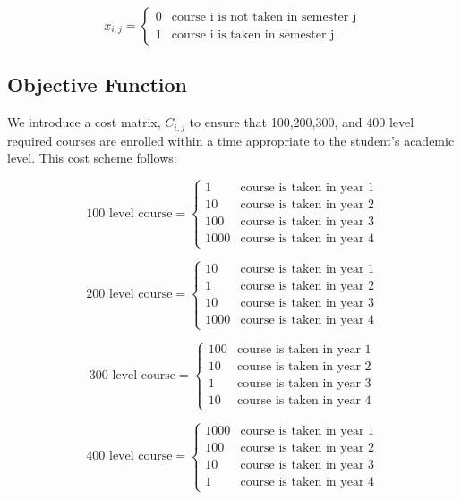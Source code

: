 \documentclass{article}
\begin{document}
\[ x_{i,j} = \begin{cases} 
      0 & \text{course i is not taken in semester j} \\
      1 & \text{course i is taken in semester j} 
   \end{cases}
\]


\subsection{Objective Function}
We introduce a cost matrix, $C_{i,j}$ to ensure that 100,200,300, and 400 level required courses are enrolled within a time appropriate to the student's academic level. This cost scheme follows:

\[ \text{100 level course} = \begin{cases} 
      1 & \text{course is taken in year 1} \\
      10 & \text{course is taken in year 2} \\
      100 & \text{course is taken in year 3} \\
      1000 & \text{course is taken in year 4} 
   \end{cases}
\]

\[ \text{200 level course} = \begin{cases} 
      10 & \text{course is taken in year 1} \\
      1 & \text{course is taken in year 2} \\
      10 & \text{course is taken in year 3} \\
      1000 & \text{course is taken in year 4} 
   \end{cases}
\]

\[ \text{300 level course} = \begin{cases} 
      100 & \text{course is taken in year 1} \\
      10 & \text{course is taken in year 2} \\
      1 & \text{course is taken in year 3} \\
      10 & \text{course is taken in year 4} 
   \end{cases}
\]

\[ \text{400 level course} = \begin{cases} 
      1000 & \text{course is taken in year 1} \\
      100 & \text{course is taken in year 2} \\
      10 & \text{course is taken in year 3} \\
      1 & \text{course is taken in year 4} 
   \end{cases}
\]
\end{document}
